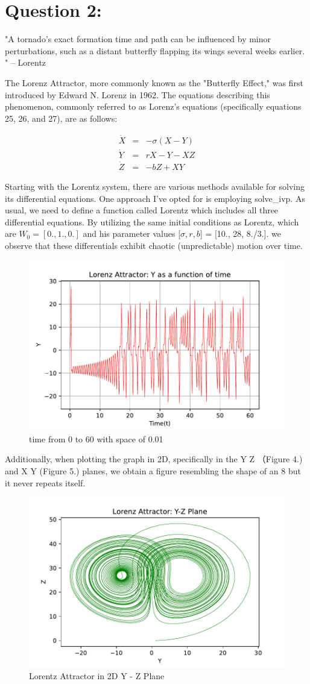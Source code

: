 \documentclass[12pt, letterpaper] {article}
\begin{document}
\section{Question 2:}

"A tornado's exact formation time and path can be influenced by minor perturbations, such as a distant butterfly flapping its wings several weeks earlier. " -- Lorentz 

The Lorenz Attractor, more commonly known as the "Butterfly Effect," was first introduced by Edward N. Lorenz in 1962. The equations describing this phenomenon, commonly referred to as Lorenz's equations (specifically equations 25, 26, and 27), are as follows:

\begin{eqnarray}
\dot X &=& -\sigma(X-Y)\\
\dot Y &=& rX -Y - XZ\\
\dot Z &=& -bZ + XY
\end{eqnarray}


Starting with the Lorentz system, there are various methods available for solving its differential equations. One approach I've opted for is employing solve\_ivp. As usual, we need to define a function called Lorentz which includes all three differential equations. By utilizing the same initial conditions as Lorentz, which are $W_0=[0., 1., 0.]$ and his parameter values [$\sigma, r, b$] = [10., 28, 8./3.]. we observe that these differentials exhibit chaotic (unpredictable) motion over time.

\begin{figure}[h!]
    \centering
    \includegraphics[width=0.45\linewidth, keepaspectratio]{Q2_figure_1.pdf}
    \caption{time from 0 to 60 with space of 0.01}
    \label{fig:Lorenz Attractor: Y as a function of time}
\end{figure}

Additionally, when plotting the graph in 2D, specifically in the Y Z （Figure 4.) and X Y (Figure 5.) planes, we obtain a figure resembling the shape of an 8 but it never repeats itself.

\begin{figure}[h!]
    \centering
    \includegraphics[width=0.5\linewidth, keepaspectratio]{Q2_figure_2_1.pdf}
    \caption{Lorentz Attractor in 2D Y - Z Plane}
    \label{fig:Lorenz Attractor: Y-Z Plane}
\end{figure}
\end{document}
